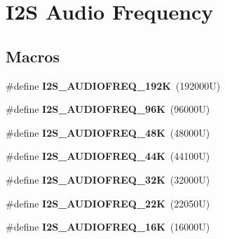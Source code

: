 \hypertarget{group___i2_s___audio___frequency}{}\section{I2S Audio Frequency}
\label{group___i2_s___audio___frequency}
\subsection*{Macros}
\begin{DoxyCompactItemize}
\item 
\mbox{\label{group___i2_s___audio___frequency_ga835e684fdb326d62c1cfc8d4b8fde944}} 
\#define {\bfseries I2\+S\+\_\+\+A\+U\+D\+I\+O\+F\+R\+E\+Q\+\_\+192K}~(192000\+U)
\item 
\mbox{\label{group___i2_s___audio___frequency_ga0b51976937c47ce42db565ec053ce80b}} 
\#define {\bfseries I2\+S\+\_\+\+A\+U\+D\+I\+O\+F\+R\+E\+Q\+\_\+96K}~(96000\+U)
\item 
\mbox{\label{group___i2_s___audio___frequency_ga7e33aad8b5089783d2d73771c8bd8c30}} 
\#define {\bfseries I2\+S\+\_\+\+A\+U\+D\+I\+O\+F\+R\+E\+Q\+\_\+48K}~(48000\+U)
\item 
\mbox{\label{group___i2_s___audio___frequency_ga62c764ebc2037c6a394909a899e1d3c3}} 
\#define {\bfseries I2\+S\+\_\+\+A\+U\+D\+I\+O\+F\+R\+E\+Q\+\_\+44K}~(44100\+U)
\item 
\mbox{\label{group___i2_s___audio___frequency_ga64bb1c92ca88c0cbf102bba816f796a5}} 
\#define {\bfseries I2\+S\+\_\+\+A\+U\+D\+I\+O\+F\+R\+E\+Q\+\_\+32K}~(32000\+U)
\item 
\mbox{\label{group___i2_s___audio___frequency_gaec6b3447020cbf5234ac36c53474c9b5}} 
\#define {\bfseries I2\+S\+\_\+\+A\+U\+D\+I\+O\+F\+R\+E\+Q\+\_\+22K}~(22050\+U)
\item 
\mbox{\label{group___i2_s___audio___frequency_gac4a77b9683937fbab4b270814a280fab}} 
\#define {\bfseries I2\+S\+\_\+\+A\+U\+D\+I\+O\+F\+R\+E\+Q\+\_\+16K}~(16000\+U)

\end{DoxyCompactItemize}
